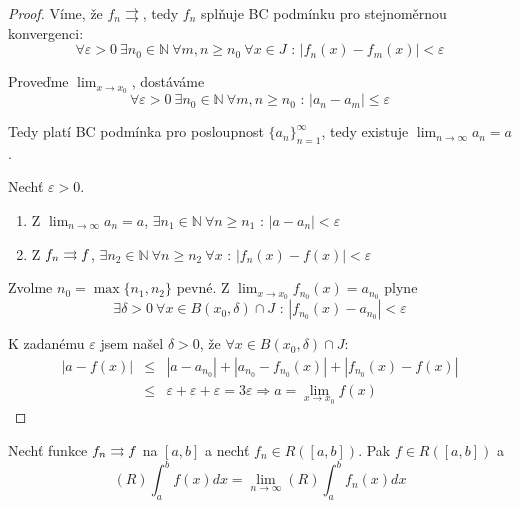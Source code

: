 \begin{proof}
Víme, že $f_n \rightrightarrows$, tedy $f_n$ splňuje BC podmínku pro stejnoměrnou konvergenci:
$$\forall \varepsilon > 0 \ \exists n_0 \in \mathbb{N} \ \forall m,n \geq n_0 \ \forall x \in J \textrm{ : } |f_n(x) - f_m(x)| < \varepsilon $$

Proveďme $\lim_{x \to x_0}$, dostáváme 
$$\forall \varepsilon>0 \ \exists n_0 \in \mathbb{N} \ \forall m,n \geq n_0 \textrm{ : } |a_n - a_m| \leq \varepsilon$$

Tedy platí BC podmínka pro posloupnost $\{ a_n \}_{n=1}^\infty$, tedy existuje $\lim_{n \to \infty}a_n = a$.

Nechť $\varepsilon > 0$. 
\begin{enumerate}
\item Z $\lim_{n \to \infty} a_n = a$, $ \exists n_1 \in \mathbb{N} \ \forall n \geq n_1 \textrm{ : } |a - a_n| < \varepsilon $
\item Z $f_n \rightrightarrows f$, $ \exists n_2 \in \mathbb{N} \ \forall n \geq n_2 \ \forall x \textrm{ : } |f_n(x) - f(x)| < \varepsilon$
\end{enumerate}

Zvolme $n_0 = \max \{n_1,n_2\}$ pevné. Z $\lim_{x \to x_0}f_{n_0}(x) = a_{n_0}$ plyne 
$$\exists \delta > 0 \ \forall x \in B(x_0,\delta) \cap J \textrm{ : } |f_{n_0}(x) - a_{n_0}| < \varepsilon$$

K zadanému $\varepsilon$ jsem našel $\delta > 0$, že $\forall x \in B(x_0, \delta) \cap J$:
\begin{eqnarray*}
|a - f(x)| & \leq & |a - a_{n_0}| + |a_{n_0} - f_{n_0}(x)| + |f_{n_0}(x) - f(x)| \\
& \leq & \varepsilon + \varepsilon + \varepsilon = 3\varepsilon \Rightarrow a=\lim_{x \to x_0}f(x)
\end{eqnarray*}

\end{proof}

\begin{vetal}
Nechť funkce $f_n \rightrightarrows f$ na $[a,b]$ a nechť $f_n \in R([a,b])$. Pak $f \in R([a,b])$ a 
$$(R) \int_a^b f(x) dx = \lim_{n \rightarrow \infty} (R) \int_a^b f_n(x) dx$$
\end{vetal}

